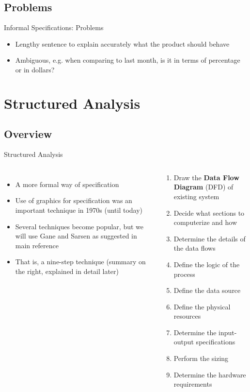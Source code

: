 \documentclass{beamer}
\begin{document}
	\subsection{Problems}
	\begin{frame}{Informal Specifications: Problems}
		\begin{itemize}
			\item Lengthy sentence to explain accurately what the product should behave
			\item Ambiguous, e.g. when comparing to last month, is it in terms of percentage or in dollars?
		\end{itemize}
	\end{frame}	

	\section{Structured Analysis}
	\subsection{Overview}
	\begin{frame}{Structured Analysis}
		\begin{columns}[t,totalwidth=\textwidth]
				\begin{itemize}
					\item A more formal way of specification
					\item Use of graphics for specification was an important technique in 1970s (until today)
					\item Several techniques become popular, but we will use Gane and Sarsen \cite{gane1977structured} as suggested in main reference
					\item That is, a nine-step technique (summary on the right, explained in detail later)
				\end{itemize}
			\begin{flushright}
				\small{
					\begin{enumerate}
						\item Draw the \textbf{Data Flow Diagram} (DFD) of existing system
						\item Decide what sections to computerize and how
						\item Determine the details of the data flows
						\item Define the logic of the process
						\item Define the data source
						\item Define the physical resources
						\item Determine the input-output specifications
						\item Perform the sizing
						\item Determine the hardware requirements
					\end{enumerate}
				}
			\end{flushright}
		\end{columns}		
	\end{frame}
\end{document}
